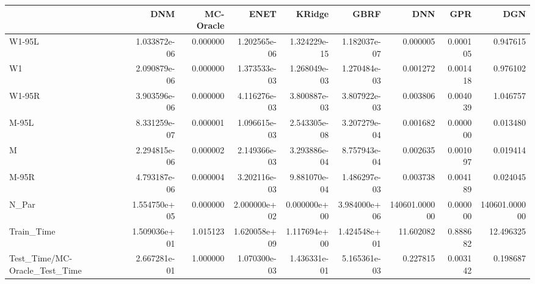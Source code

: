 \begin{tabular}{lrrrrrrrr}
\toprule
{} &           DNM &  MC-Oracle &          ENET &        KRidge &          GBRF &            DNN &       GPR &            DGN \\
\midrule
W1-95L                        &  1.033872e-06 &   0.000000 &  1.202565e-06 &  1.324229e-15 &  1.182037e-07 &       0.000005 &  0.000105 &       0.947615 \\
W1                            &  2.090879e-06 &   0.000000 &  1.373533e-03 &  1.268049e-03 &  1.270484e-03 &       0.001272 &  0.001418 &       0.976102 \\
W1-95R                        &  3.903596e-06 &   0.000000 &  4.116276e-03 &  3.800887e-03 &  3.807922e-03 &       0.003806 &  0.004039 &       1.046757 \\
M-95L                         &  8.331259e-07 &   0.000001 &  1.096615e-03 &  2.543305e-08 &  3.207279e-04 &       0.001682 &  0.000000 &       0.013480 \\
M                             &  2.294815e-06 &   0.000002 &  2.149366e-03 &  3.293886e-04 &  8.757943e-04 &       0.002635 &  0.001097 &       0.019414 \\
M-95R                         &  4.793187e-06 &   0.000004 &  3.202116e-03 &  9.881070e-04 &  1.486297e-03 &       0.003738 &  0.004189 &       0.024045 \\
N\_Par                         &  1.554750e+05 &   0.000000 &  2.000000e+02 &  0.000000e+00 &  3.984000e+06 &  140601.000000 &  0.000000 &  140601.000000 \\
Train\_Time                    &  1.509036e+01 &   1.015123 &  1.620058e+09 &  1.117694e+00 &  1.424548e+01 &      11.602082 &  0.888682 &      12.496325 \\
Test\_Time/MC-Oracle\_Test\_Time &  2.667281e-01 &   1.000000 &  1.070300e-03 &  1.436331e-01 &  5.165361e-03 &       0.227815 &  0.003142 &       0.198687 \\
\bottomrule
\end{tabular}
